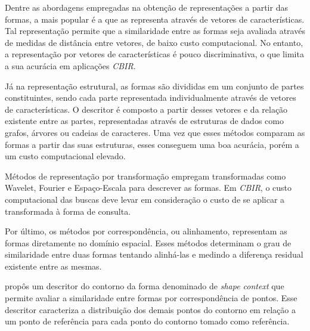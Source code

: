 Dentre as abordagens empregadas na obtenção de representações a partir das formas, a mais popular é a que as representa através de vetores de características. Tal representação permite que a similaridade entre as formas seja avaliada através de medidas de distância entre vetores, de baixo custo computacional. No entanto, a representação por vetores de características é pouco discriminativa, o que limita a sua acurácia em aplicações \emph{CBIR}.

Já na representação estrutural, as formas são divididas em um conjunto de partes constituintes, sendo cada parte representada individualmente através de vetores de características. O descritor é composto a partir desses vetores e da relação existente entre as partes, representadas através de estruturas de dados como grafos, árvores ou cadeias de caracteres. Uma vez que esses métodos comparam as formas a partir das suas estruturas, esses conseguem uma boa acurácia, porém a um custo computacional elevado.

Métodos de representação por transformação empregam transformadas como Wavelet, Fourier e Espaço-Escala para descrever as formas. Em \emph{CBIR}, o custo computacional das buscas deve levar em consideração o custo de se aplicar a transformada à forma de consulta. 

Por último, os métodos por correspondência, ou alinhamento, representam as formas diretamente no domínio espacial. Esses métodos determinam o grau de similaridade entre duas formas tentando alinhá-las e medindo a diferença residual existente entre as mesmas.

 propôs um descritor do contorno da forma denominado de \emph{shape context} que permite avaliar a similaridade entre formas por correspondência de pontos. Esse descritor caracteriza a distribuição dos demais pontos do contorno em relação a um ponto de referência para cada ponto do contorno tomado como referência. 



